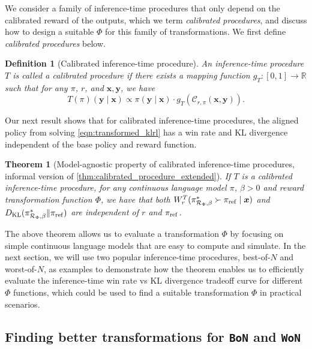 \documentclass{article}
\newcommand{\by}{{\bm{y}}}
\newcommand{\bx}{{\bm{x}}}
\newcommand{\cR}{\mathcal{R}}
\newcommand{\reg}{\beta}
\newcommand{\KL}{D_{\text{KL}}}
\newcommand{\calp}{g_{\pp}}
\newcommand{\pp}{T}
\newcommand{\bp}{{\pi_{\rm ref}}} %
\newcommand{\op}{\pi} %
\newcommand{\qt}{\mathcal{C}}
\newtheorem{theorem}{Theorem}
\newtheorem{definition}{Definition}
\newcommand{\RR}{\mathbb{R}}
\newcommand{\bofn}{\texttt{BoN}\xspace}
\newcommand{\wofn}{\texttt{WoN}\xspace}
\begin{document}
We consider a family of inference-time procedures that only depend on the calibrated reward of the outputs, which we term \textit{calibrated procedures}, and discuss how to design a suitable $\Phi$ for this family of transformations. We first define \textit{calibrated procedures} below.

\begin{definition}[Calibrated inference-time procedure]\label{def:calibrated_transformation}
An inference-time procedure $T$ is called a \emph{calibrated procedure} if there exists a mapping function $\calp: [0, 1] \rightarrow \RR$ such that for any $\pi$, $r$, and $\bx, \by$, we have
\[
    T(\pi)(\by \mid \bx) \propto \pi(\by \mid \bx) \cdot \calp(\qt_{r, \pi} (\bx, \by)).
\]
\end{definition}
%

Our next result shows that for calibrated inference-time procedures, the aligned policy from solving \cref{eqn:transformed_klrl} has a win rate and KL divergence independent of the base policy and reward function.
\begin{theorem}[Model-agnostic property of calibrated inference-time procedures, informal version of \cref{thm:calibrated_procedure_extended}] \label{thm:calibrated_procedure}
If $T$ is a calibrated inference-time procedure, for any continuous language model $\pi$, $\reg > 0$ and reward transformation function $\Phi$,  we have that both $W^T_r(\op^*_{\cR_{\Phi}, \reg} \succ \bp \mid \bx)$ and $\KL(\op^*_{\cR_{\Phi}, \reg} \| \bp)$ are independent of $r$ and $\bp$.
\end{theorem}

%
%
%


%
The above theorem allows us to evaluate a transformation $\Phi$ by focusing on simple continuous language models that are easy to compute and simulate. In the next section, we will use two popular inference-time procedures, best-of-$N$ and worst-of-$N$, as examples to demonstrate how the theorem enables us to 
efficiently evaluate the inference-time win rate vs KL divergence tradeoff curve for different $\Phi$ functions, which could be used to find a suitable transformation $\Phi$ in practical scenarios.

%

%
%
%
%
%
%
%
%
%
%
%

%
%

%


%

%

\subsection{Finding better transformations for \bofn and \wofn} \label{sec:bon_won}
\end{document}
